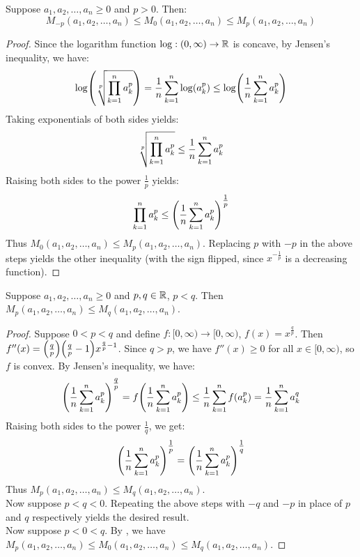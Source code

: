 \documentclass[main.tex]{subfiles}
\begin{document}
\begin{lemma}\label{holder_geometric_mean_inequality}
    Suppose $a_1,a_2,\ldots,a_n\ge 0$ and $p>0$. Then:
    \begin{equation*}
        M_{-p}(a_1,a_2,\ldots,a_n)\le M_0(a_1,a_2,\ldots,a_n)\le M_p(a_1,a_2,\ldots,a_n)
    \end{equation*}
\end{lemma}
\begin{proof}
    Since the logarithm function $\log:(0,\infty)\to\R$ is concave, by Jensen's inequality, we have:
    \begin{align*}
        \log(\sqrt[p]{\prod_{k=1}^n a_k^p})
        = \frac{1}{n}\sum_{k=1}^n \log(a_k^p)
        \le \log(\frac{1}{n}\sum_{k=1}^n a_k^p)
    \end{align*}
    Taking exponentials of both sides yields:
    \begin{equation*}
        \sqrt[p]{\prod_{k=1}^n a_k^p}
        \le \frac{1}{n}\sum_{k=1}^n a_k^p
    \end{equation*}
    Raising both sides to the power $\frac{1}{p}$ yields:
    \begin{equation*}
        \prod_{k=1}^n a_k^p
        \le \qty(\frac{1}{n}\sum_{k=1}^n a_k^p)^{\tfrac{1}{p}}
    \end{equation*}
    Thus $M_0(a_1,a_2,\ldots,a_n)\le M_p(a_1,a_2,\ldots,a_n)$. Replacing $p$ with $-p$ in the above steps yields the other inequality (with the sign flipped, since $x^{-\tfrac{1}{p}}$ is a decreasing function).
\end{proof}

\begin{theorem}
    Suppose $a_1,a_2,\ldots,a_n\ge 0$ and $p,q\in\R$, $p<q$. Then $M_p(a_1,a_2,\ldots,a_n)\le M_q(a_1,a_2,\ldots,a_n)$.
\end{theorem}
\begin{proof}
    Suppose $0<p<q$ and define $f:[0,\infty)\to[0,\infty)$, $f(x)=x^{\frac{q}{p}}$. Then $f''(x)=\qty(\frac{q}{p})\qty(\frac{q}{p}-1)x^{\frac{q}{p}-1}$. Since $q>p$, we have $f''(x)\ge 0$ for all $x\in[0,\infty)$, so $f$ is convex. By Jensen's inequality, we have:
    \begin{equation*}
        \qty(\frac{1}{n}\sum_{k=1}^n a_k^p)^{\tfrac{q}{p}}
        = f\qty(\frac{1}{n}\sum_{k=1}^n a_k^p)
        \le \frac{1}{n}\sum_{k=1}^n f\qty(a_k^p)
        = \frac{1}{n}\sum_{k=1}^n a_k^q
    \end{equation*}
    Raising both sides to the power $\frac{1}{q}$, we get:
    \begin{equation*}
        \qty(\frac{1}{n}\sum_{k=1}^n a_k^p)^{\tfrac{1}{p}}
        = \qty(\frac{1}{n}\sum_{k=1}^n a_k^p)^{\tfrac{1}{q}}
    \end{equation*}
    Thus $M_p(a_1,a_2,\ldots,a_n)\le M_q(a_1,a_2,\ldots,a_n)$.\\

    Now suppose $p<q<0$. Repeating the above steps with $-q$ and $-p$ in place of $p$ and $q$ respectively yields the desired result.\\

    Now suppose $p<0<q$. By , we have $M_p(a_1,a_2,\ldots,a_n)\le M_0(a_1,a_2,\ldots,a_n)\le M_q(a_1,a_2,\ldots,a_n)$.
\end{proof}
\end{document}
